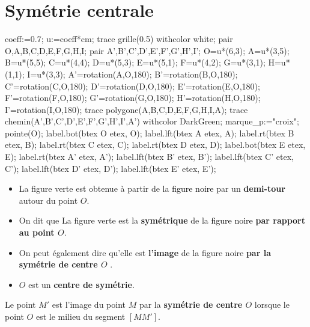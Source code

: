 \section{Symétrie centrale}
\begin{minipage}{0.5\linewidth}
\begin{center}

    \begin{Geometrie}[CoinHD={(8.4u,4.2u)}]
        coeff:=0.7;
        u:=coeff*cm;        
        trace grille(0.5) withcolor white;        
        pair O,A,B,C,D,E,F,G,H,I;
        pair A',B',C',D',E',F',G',H',I';
        O=u*(6,3);
        A=u*(3,5);
        B=u*(5,5);
        C=u*(4,4);
        D=u*(5,3);
        E=u*(5,1);
        F=u*(4,2);
        G=u*(3,1);
        H=u*(1,1);
        I=u*(3,3);        
        A'=rotation(A,O,180);
        B'=rotation(B,O,180);
        C'=rotation(C,O,180);
        D'=rotation(D,O,180);
        E'=rotation(E,O,180);
        F'=rotation(F,O,180);
        G'=rotation(G,O,180);
        H'=rotation(H,O,180);
        I'=rotation(I,O,180);
        trace polygone(A,B,C,D,E,F,G,H,I,A);
        trace chemin(A',B',C',D',E',F',G',H',I',A') withcolor DarkGreen;
        marque_p:="croix";
        pointe(O);
        label.bot(btex O etex, O);
        label.lft(btex A etex, A);
        label.rt(btex B etex, B);
        label.rt(btex C etex, C);
        label.rt(btex D etex, D);
        label.bot(btex E etex, E);  
        label.rt(btex A' etex, A');
        label.lft(btex B' etex, B');
        label.lft(btex C' etex, C');
        label.lft(btex D' etex, D');
        label.lft(btex E' etex, E');
    \end{Geometrie}    
\end{center}
\end{minipage}
\begin{minipage}{0.6\linewidth}
\begin{changemargin}{0mm}{-5mm}
    \begin{vocabulaire}
        \begin{itemize}    
            \item La \textcolor{mygreen}{figure verte} est obtenue à partir de la \textcolor{black}{figure noire} par un \textbf{demi-tour} autour du point $O$.
            \item On dit que La \textcolor{mygreen}{figure verte} est la \textbf{symétrique} de la \textcolor{black}{figure noire} \textbf{par rapport au point $O$}.
            \item On peut également dire qu'elle est \textbf{l'image} de la figure noire \textbf{par la symétrie de centre $O$} .
            \item $O$ est un \textbf{centre de symétrie}.
        \end{itemize}
    \end{vocabulaire}
\end{changemargin}
\end{minipage}

\begin{definition}
    Le point $M'$ est l'image du point $M$ par la \textbf{symétrie de centre $O$} lorsque le point $O$ est le milieu du segment $[MM']$.
 \end{definition}